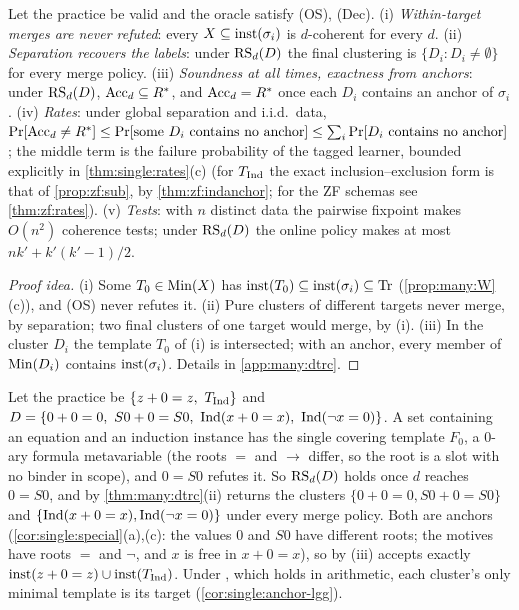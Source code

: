 \begin{theorem}[\DTRC]\label{thm:many:dtrc}
Let the practice be valid and the oracle satisfy (OS), (Dec).
(i) \emph{Within-target merges are never refuted}: every $X\subseteq\mathrm{inst}(\sigma_i)$ is $d$-coherent for every $d$.
(ii) \emph{Separation recovers the labels}: under $\mathrm{RS}_d(D)$ the final clustering is $\{D_i:D_i\neq\emptyset\}$ for every
merge policy.
(iii) \emph{Soundness at all times, exactness from anchors}: under $\mathrm{RS}_d(D)$, $\mathrm{Acc}_d\subseteq R^{*}$, and
$\mathrm{Acc}_d=R^{*}$ once each $D_i$ contains an anchor of $\sigma_i$.
(iv) \emph{Rates}: under global separation and i.i.d.\ data, $\Pr[\mathrm{Acc}_d\neq R^{*}]\le\Pr[\text{some }D_i\text{
contains no anchor}]\le\sum_i\Pr[D_i\text{ contains no anchor}]$; the middle term is the failure probability of the tagged
learner, bounded explicitly in \cref{thm:single:rates}(c) (for $T_{\mathrm{Ind}}$ the exact inclusion--exclusion form is that of
\cref{prop:zf:sub}, by \cref{thm:zf:indanchor}; for the ZF schemas see \cref{thm:zf:rates}).
(v) \emph{Tests}: with $n$ distinct data the pairwise fixpoint makes $O(n^2)$ coherence tests; under $\mathrm{RS}_d(D)$ the online
policy makes at most $nk'+k'(k'-1)/2$.
\end{theorem}
\begin{proof}[Proof idea]
(i) Some $T_0\in\mathrm{Min}(X)$ has $\mathrm{inst}(T_0)\subseteq\mathrm{inst}(\sigma_i)\subseteq\mathrm{Tr}$ (\cref{prop:many:W}(c)), and (OS) never
refutes it. (ii) Pure clusters of different targets never merge, by separation; two final clusters of one target would
merge, by (i). (iii) In the cluster $D_i$ the template $T_0$ of (i) is intersected; with an anchor, every member of
$\mathrm{Min}(D_i)$ contains $\mathrm{inst}(\sigma_i)$. Details in \cref{app:many:dtrc}.
\end{proof}

\begin{example}\label{ex:many:run}
Let the practice be $\{z+0=z,\ T_{\mathrm{Ind}}\}$ and $D=\{0+0=0,\ S0+0=S0,\ \mathrm{Ind}(x+0=x),\ \mathrm{Ind}(\neg x=0)\}$. A set containing an
equation and an induction instance has the single covering template $F_0$, a $0$-ary formula metavariable (the roots $=$
and $\to$ differ, so the root is a slot with no binder in scope), and $0=S0$ refutes it. So $\mathrm{RS}_d(D)$ holds once $d$
reaches $0=S0$, and by \cref{thm:many:dtrc}(ii) \DTRC{} returns the clusters $\{0+0=0,S0+0=S0\}$ and
$\{\mathrm{Ind}(x+0=x),\mathrm{Ind}(\neg x=0)\}$ under every merge policy. Both are anchors (\cref{cor:single:special}(a),(c): the values
$0$ and $S0$ have different roots; the motives have roots $=$ and $\neg$, and $x$ is free in $x+0=x$), so by (iii) \DTRC{}
accepts exactly $\mathrm{inst}(z+0=z)\cup\mathrm{inst}(T_{\mathrm{Ind}})$. Under \Rich, which holds in arithmetic, each cluster's only minimal
template is its target (\cref{cor:single:anchor-lgg}).
\end{example}

